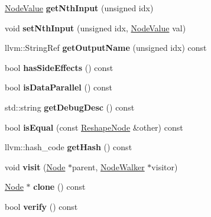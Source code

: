 \begin{DoxyCompactItemize}
\mbox{\label{classglow_1_1_reshape_node_a87e04723cab7d91e62643f0a40097dfe}} 
\hyperlink{structglow_1_1_node_value}{Node\+Value} {\bfseries get\+Nth\+Input} (unsigned idx)
\item 
\mbox{\label{classglow_1_1_reshape_node_a731bfc08e2a6d2f899a2a605a52a476d}} 
void {\bfseries set\+Nth\+Input} (unsigned idx, \hyperlink{structglow_1_1_node_value}{Node\+Value} val)
\item 
\mbox{\label{classglow_1_1_reshape_node_aa182b46502814d67b60c2f69de8848cb}} 
llvm\+::\+String\+Ref {\bfseries get\+Output\+Name} (unsigned idx) const
\item 
\mbox{\label{classglow_1_1_reshape_node_a39d53c47c9fe7b4ed91cca158a67dabf}} 
bool {\bfseries has\+Side\+Effects} () const
\item 
\mbox{\label{classglow_1_1_reshape_node_a7633cdcfa3506ae57dc135bd37021d89}} 
bool {\bfseries is\+Data\+Parallel} () const
\item 
\mbox{\label{classglow_1_1_reshape_node_afb1c73d4685b65fc4b90cd75ee3b55db}} 
std\+::string {\bfseries get\+Debug\+Desc} () const
\item 
\mbox{\label{classglow_1_1_reshape_node_ac3ad9737ca20b42a1b044e704fd631b4}} 
bool {\bfseries is\+Equal} (const \hyperlink{classglow_1_1_reshape_node}{Reshape\+Node} \&other) const
\item 
\mbox{\label{classglow_1_1_reshape_node_ae00da78b315d39979c0c2a3a3db5b079}} 
llvm\+::hash\+\_\+code {\bfseries get\+Hash} () const
\item 
\mbox{\label{classglow_1_1_reshape_node_a4ffc59b928d939cacb21a534b8c2dee3}} 
void {\bfseries visit} (\hyperlink{classglow_1_1_node}{Node} $\ast$parent, \hyperlink{classglow_1_1_node_walker}{Node\+Walker} $\ast$visitor)
\item 
\mbox{\label{classglow_1_1_reshape_node_a7f76493e25f26fda99fc4de3dce072ca}} 
\hyperlink{classglow_1_1_node}{Node} $\ast$ {\bfseries clone} () const
\item 
\mbox{\label{classglow_1_1_reshape_node_ac4f8326c88b41801eb0d9f47d115971e}} 
bool {\bfseries verify} () const
\end{DoxyCompactItemize}
